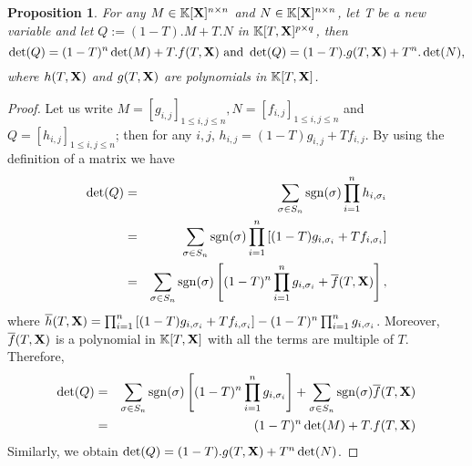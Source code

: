 \documentclass[11pt]{article}
\numberwithin{Property}{section}
\numberwithin{Theorem}{section}
\newtheorem{Proposition}{Proposition}%
\numberwithin{Proposition}{section}
\numberwithin{Lemma}{section}
\numberwithin{Corollary}{section}
\numberwithin{Definition}{section}
\numberwithin{Remark}{section}
\numberwithin{Conjecture}{section}
\numberwithin{Problem}{section}
\numberwithin{Claim}{section}
\theoremstyle{definition}
\numberwithin{Example}{section}
\renewcommand{\leq}{\leqslant}
\def\bar{\overline}
\newcommand{\field}{\mathbb{K}} %
\newcommand{\mat}[1]{\mathbf{\MakeUppercase{#1}}} %
\begin{document}
\begin{Proposition}\label{det}
For any $M \in \field[\mat{X}]^{n \times n}$ and $N \in \field[\mat{X}]^{n \times n}$, let T be a new variable and let $Q := (1-T).M + T.N$ in $\field[T, \mat{X}]^{p \times q}$, then 
\[
\det(Q) = (1-T)^n \det(M) + T.f(T,\mat{X}) \ \mathrm{and} \ \det(Q) = (1-T).g(T,\mat{X}) + T^n.\det(N),
\] where $h(T,\mat{X})$ and $g(T,\mat{X})$ are polynomials in $\field[T,\mat{X}]$.
\end{Proposition}
\begin{proof}
Let us write $M = [g_{i,j}]_{1 \leq i,j \leq n}, N = [f_{i,j}]_{1 \leq i,j \leq n}$ and $Q = [h_{i,j}]_{1 \leq i,j \leq n}$; then for any $i,j$,  $h_{i,j} = (1-T)g_{i,j} + Tf_{i,j}$. By using the definition of a matrix we have 
\begin{eqnarray*}
\det(Q) &=& \sum_{\sigma \in S_n}\mathrm{sgn}(\sigma)\prod_{i = 1}^nh_{i,\sigma_i}\\
&=& \sum_{\sigma \in S_n}\mathrm{sgn}(\sigma)\prod_{i = 1}^n\left[(1-T)g_{i,\sigma_i} + Tf_{i,\sigma_i}\right]\\
&=& \sum_{\sigma \in S_n}\mathrm{sgn}(\sigma)\left[(1-T)^n\prod_{i = 1}^ng_{i,\sigma_i} + \bar{f}(T,\mat{X})\right],
\end{eqnarray*}
where $\bar{h}(T,\mat{X}) = \prod_{i = 1}^n\left[(1-T)g_{i,\sigma_i} + Tf_{i,\sigma_i}\right] - (1-T)^n\prod_{i = 1}^ng_{i,\sigma_i}$. Moreover, $\bar{f}(T,\mat{X})$ is a polynomial in $\field[T, \mat{X}]$ with all the terms are multiple of $T$. Therefore, 
\begin{eqnarray*}
\det(Q) &=&  \sum_{\sigma \in S_n}\mathrm{sgn}(\sigma)\left[(1-T)^n\prod_{i = 1}^ng_{i,\sigma_i}\right] + \sum_{\sigma \in S_n}\mathrm{sgn}(\sigma)\bar{f}(T,\mat{X}) \\
&=& (1-T)^n\det(M) + T.f(T,\mat{X})
\end{eqnarray*}
Similarly, we obtain $\det(Q) = (1-T).g(T,\mat{X}) + T^n\det(N)$.
\end{proof}
\end{document}
